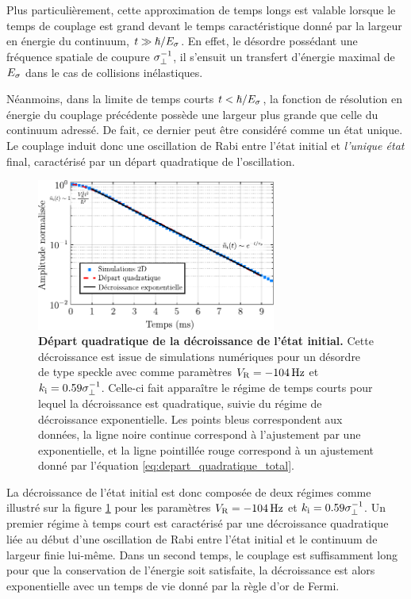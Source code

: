 Plus particulièrement, cette approximation de temps longs est valable lorsque le temps de couplage est grand devant le temps caractéristique donné par la largeur en énergie du continuum, $t\gg\hslash/E_{\sigma}$. En effet, le désordre possédant une fréquence spatiale de coupure $\sigma_{\perp}^{-1}$, il s'ensuit un transfert d'énergie maximal de $E_{\sigma}$ dans le cas de collisions inélastiques.

Néanmoins, dans la limite de temps courts $t<\hslash/E_{\sigma}$, la fonction de résolution en énergie du couplage précédente possède une largeur plus grande que celle du continuum adressé. De fait, ce dernier peut être considéré comme un état unique. Le couplage induit donc une oscillation de Rabi entre l'état initial et \emph{l'unique état} final, caractérisé par un départ quadratique de l'oscillation.

\begin{figure}
\centering
\includegraphics[width=0.7\textwidth]{Fig/TauS_PRL/depart_quadratique_taus.pdf}
\caption{\textbf{Départ quadratique de la décroissance de l'état initial.} Cette décroissance est issue de simulations numériques  pour un désordre de type speckle avec comme paramètres $V_{\mathrm{R}}=\SI{-104}{\hertz}$ et $k_{\mathrm{i}}=0.59\sigma_{\perp}^{-1}$. Celle-ci fait apparaître le régime de temps courts pour lequel la décroissance est quadratique, suivie du régime de décroissance exponentielle. Les points bleus correspondent aux données, la ligne noire continue correspond à l'ajustement par une exponentielle, et la ligne pointillée rouge correspond à un ajustement donné par l'équation \ref{eq:depart_quadratique_total}. }
\label{fig:depart_quadratique_taus}
\end{figure}

La décroissance de l'état initial est donc composée de deux régimes comme illustré sur la figure \ref{fig:depart_quadratique_taus} pour les paramètres $V_{\mathrm{R}}=\SI{-104}{\hertz}$ et $k_{\mathrm{i}}=0.59\sigma_{\perp}^{-1}$. Un premier régime à temps court est caractérisé par une décroissance quadratique liée au début d'une oscillation de Rabi entre l'état initial et le continuum de largeur finie lui-même. Dans un second temps, le couplage est suffisamment long pour que la conservation de l'énergie soit satisfaite, la décroissance est alors exponentielle avec un temps de vie donné par la règle d'or de Fermi.

